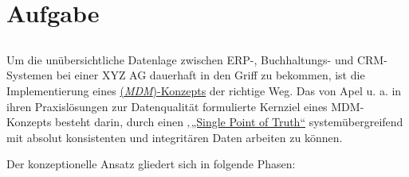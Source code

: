 
\chapter{Aufgabe}
\label{chap:4 Aufgabe}
\thispagestyle{fancy}
\section*{} Um die unübersichtliche Datenlage zwischen \acs{ERP}-, Buchhaltungs- und \acs{CRM}-Systemen bei einer XYZ AG dauerhaft in den Griff zu bekommen, ist die Implementierung eines \uline{(\textit{\acs{MDM}})-Konzepts} der richtige Weg. Das von Apel \acs{u. a.} \cite[85]{21} in ihren Praxislösungen zur Datenqualität formulierte Kernziel eines \acs{MDM}-Konzepts besteht darin, durch einen ‚\uline{„Single Point of Truth“} systemübergreifend mit absolut konsistenten und integritären Daten arbeiten zu können.
 \par Der konzeptionelle Ansatz gliedert sich in folgende Phasen:
